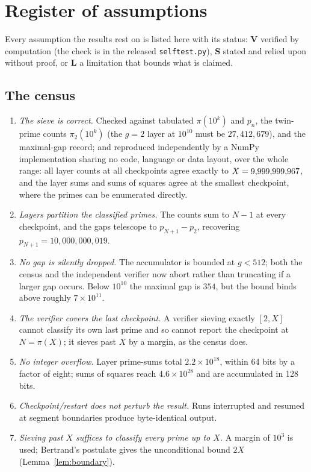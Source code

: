 \section{Register of assumptions}
\label{app:assumptions}

Every assumption the results rest on is listed here with its status: \textbf{V} verified by computation (the check is in the released \texttt{selftest.py}), \textbf{S} stated and relied upon without proof, or \textbf{L} a limitation that bounds what is claimed.

\subsection*{The census}

\begin{enumerate}
\item[V] \emph{The sieve is correct.} Checked against tabulated $\pi(10^k)$ and $p_n$, the twin-prime counts $\pi_2(10^k)$ (the $g=2$ layer at $10^{10}$ must be $27{,}412{,}679$), and the maximal-gap record; and reproduced independently by a NumPy implementation sharing no code, language or data layout, over the whole range: all \verifyLayers{} layer counts at all \nScales{} checkpoints agree exactly to $X=9{,}999{,}999{,}967$, and the layer sums and sums of squares agree at the smallest checkpoint, where the primes can be enumerated directly.
\item[V] \emph{Layers partition the classified primes.} The counts sum to $N-1$ at every checkpoint, and the gaps telescope to $p_{N+1}-p_2$, recovering $p_{N+1}=10{,}000{,}000{,}019$.
\item[V] \emph{No gap is silently dropped.} The accumulator is bounded at $g<512$; both the census and the independent verifier now abort rather than truncating if a larger gap occurs. Below $10^{10}$ the maximal gap is $354$, but the bound binds above roughly $7\times10^{11}$.

\item[V] \emph{The verifier covers the last checkpoint.} A verifier sieving exactly $[2,X]$ cannot classify its own last prime and so cannot report the checkpoint at $N=\pi(X)$; it sieves past $X$ by a margin, as the census does.
\item[V] \emph{No integer overflow.} Layer prime-sums total $2.2\times10^{18}$, within 64 bits by a factor of eight; sums of squares reach $4.6\times10^{28}$ and are accumulated in 128 bits.
\item[V] \emph{Checkpoint/restart does not perturb the result.} Runs interrupted and resumed at segment boundaries produce byte-identical output.
\item[V] \emph{Sieving past $X$ suffices to classify every prime up to $X$.} A margin of $10^3$ is used; Bertrand's postulate gives the unconditional bound $2X$ (Lemma~\ref{lem:boundary}).
\end{enumerate}

